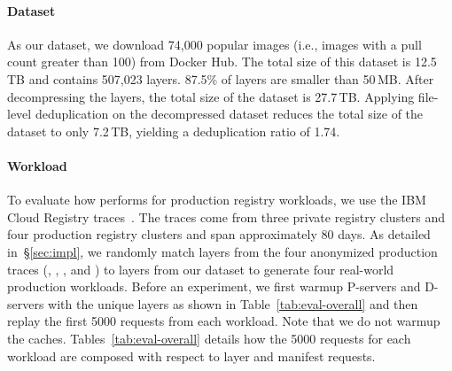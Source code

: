 \paragraph{Dataset}
%
As our dataset, we download 74,000 popular images (i.e., images with a pull count greater than 100) from Docker Hub.
% 
The total size of this dataset is 12.5\,TB and contains 507,023 layers. 87.5\% of layers are smaller than 50\,MB.
%
After decompressing the layers, the total size of the dataset is 27.7\,TB.
%
Applying file-level deduplication on the decompressed dataset
reduces the total size of the dataset to only 7.2\,TB, yielding 
a deduplication ratio of 1.74.
%
%
  
\paragraph{Workload}
%
To evaluate how \sysname performs for production registry workloads, 
we use the IBM Cloud Registry traces~\cite{dockerworkload}.
%
The traces come from three private registry clusters and 
four production registry clusters and span approximately 80 days.
%
As detailed in~\S\ref{sec:impl}, we randomly match layers from the four anonymized production
traces (\dal, \fra, \lon, and \syd) to layers from our dataset to generate four real-world production workloads.
%
Before an experiment, we first warmup P-servers and D-servers with the unique layers as shown in
Table~\ref{tab:eval-overall} and then replay the first 5000 requests from each workload.
Note that we do not warmup the caches.
%
%
Tables~\ref{tab:eval-overall} details how the 5000 requests for each workload are composed
with respect to layer and manifest requests.

